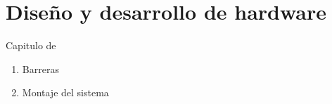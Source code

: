 \chapter{Diseño y desarrollo de hardware}

Capitulo de

\begin{enumerate}
    \item Barreras
    \item Montaje del sistema
\end{enumerate}